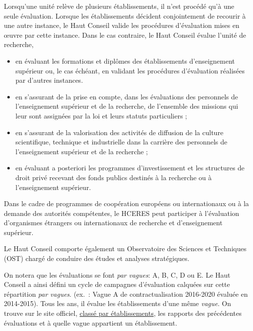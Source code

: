 Lorsqu'une unit\'e rel\`eve de plusieurs \'etablissements, il n'est proc\'ed\'e qu'\`a une seule \'evaluation. 
Lorsque les \'etablissements d\'ecident conjointement de recourir \`a une autre instance, le Haut Conseil valide les proc\'edures d'\'evaluation mises en \oe uvre par cette instance. Dans le cas contraire, le Haut Conseil \'evalue l'unit\'e de recherche,
\begin{itemize}
\item en \'evaluant les formations et dipl\^omes des \'etablissements d'enseignement sup\'erieur ou, le cas \'ech\'eant, 
en validant les proc\'edures d'\'evaluation r\'ealis\'ees par d'autres instances.
\item en s'assurant de la prise en compte, dans les \'evaluations des personnels de l'enseignement sup\'erieur et de la recherche, de l'ensemble des missions qui leur sont assign\'ees par la loi et leurs statuts particuliers ;
\item en s'assurant de la valorisation des activit\'es de diffusion de la culture scientifique, technique et industrielle dans la carri\`ere des personnels de l'enseignement sup\'erieur et de la recherche ;
\item en \'evaluant a posteriori les programmes d'investissement et les structures de droit priv\'e recevant des fonds publics destin\'es \`a la recherche ou \`a l'enseignement sup\'erieur. 
\end{itemize}
Dans le cadre de programmes de coop\'eration europ\'eens ou internationaux ou \`a la demande des autorit\'es comp\'etentes, le HCERES peut participer \`a l'\'evaluation d'organismes \'etrangers ou internationaux de recherche et d'enseignement sup\'erieur.

Le Haut Conseil comporte \'egalement un Observatoire des Sciences et Techniques (OST) charg\'e de conduire des \'etudes et analyses strat\'egiques. 

On notera que les évaluations se font \textit{par vagues}: A, B, C, D ou E.
Le Haut Conseil a ainsi défini un cycle de campagnes d'évaluation calquées sur cette répartition \textit{par vagues}. 
(ex.~: Vague A de contractualisation 2016-2020 \'evalu\'ee en 2014-2015). 
Tous les ans, il évalue les établissements d'une même \textit{vague}.
On trouve sur le site officiel, \href{http://www.hceres.fr/PUBLICATIONS/Rapports-d-evaluation/Listes-alphabetiques/Liste-des-etablissements-evalues-par-academie}{classé par établissements},
les rapports des précédentes évaluations et à quelle vague appartient un établissement.


